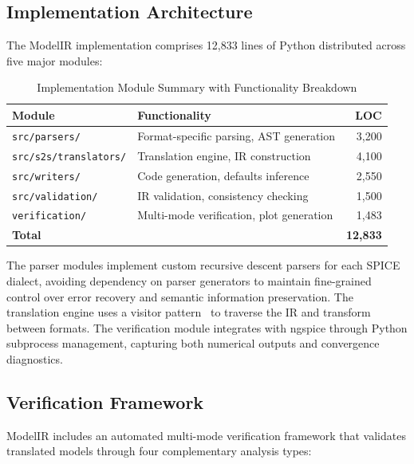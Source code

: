 \documentclass[10pt,twocolumn]{article}
\begin{document}
\subsection{Implementation Architecture}

The ModelIR implementation comprises 12,833 lines of Python distributed across five major modules:

\begin{table}[!t]
\caption{Implementation Module Summary with Functionality Breakdown}
\label{tab:implementation}
\centering
\renewcommand{\arraystretch}{1.15}
\begin{tabular}{@{}llr@{}}
\toprule
\textbf{Module} & \textbf{Functionality} & \textbf{LOC} \\
\midrule
\texttt{src/parsers/} & Format-specific parsing, AST generation & 3,200 \\
\texttt{src/s2s/translators/} & Translation engine, IR construction & 4,100 \\
\texttt{src/writers/} & Code generation, defaults inference & 2,550 \\
\texttt{src/validation/} & IR validation, consistency checking & 1,500 \\
\texttt{verification/} & Multi-mode verification, plot generation & 1,483 \\
\midrule
\textbf{Total} & & \textbf{12,833} \\
\bottomrule
\end{tabular}
\end{table}

The parser modules implement custom recursive descent parsers for each SPICE dialect, avoiding dependency on parser generators to maintain fine-grained control over error recovery and semantic information preservation. The translation engine uses a visitor pattern~\cite{design_patterns} to traverse the IR and transform between formats. The verification module integrates with ngspice through Python subprocess management, capturing both numerical outputs and convergence diagnostics.

\subsection{Verification Framework}

ModelIR includes an automated multi-mode verification framework that validates translated models through four complementary analysis types:
\end{document}
